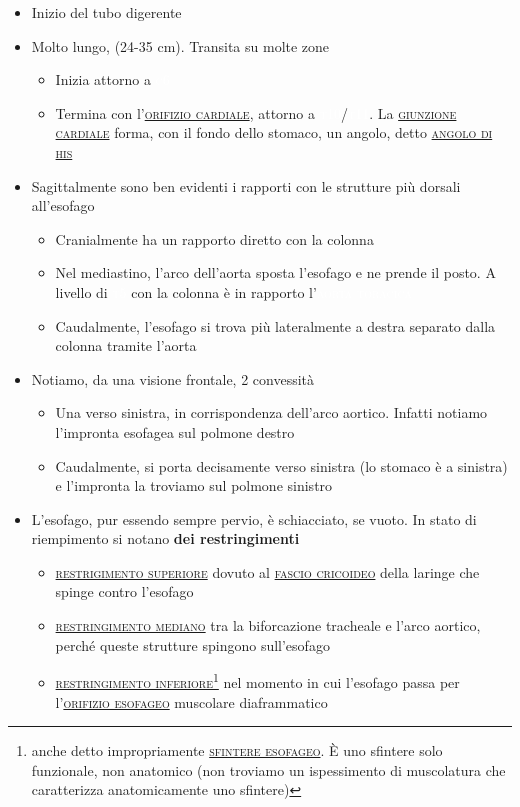 \documentclass[italian,]{article}
\providecommand{\tightlist}{%
  \setlength{\itemsep}{0pt}\setlength{\parskip}{0pt}}
\newcommand{\oss}[1]{\colorbox{ossa}{\textcolor{white}{\textsc{#1}}}}
\newcommand{\art}[1]{\colorbox{RedOrange}{\textcolor{white}{\textsc{#1}}}}
\renewcommand{\a}[1]{\underline{\textsc{#1}}}
\begin{document}
\begin{itemize}
\tightlist
\item
  Inizio del tubo digerente
\item
  Molto lungo, (24-35 cm). Transita su molte zone

  \begin{itemize}
  \tightlist
  \item
    Inizia attorno a \oss{c6}
  \item
    Termina con l'\a{orifizio cardiale}, attorno a \oss{t10}/\oss{t11}.
    La \a{giunzione cardiale} forma, con il fondo dello stomaco, un
    angolo, detto \a{angolo di his}
  \end{itemize}
\item
  Sagittalmente sono ben evidenti i rapporti con le strutture più
  dorsali all'esofago

  \begin{itemize}
  \tightlist
  \item
    Cranialmente ha un rapporto diretto con la colonna
  \item
    Nel mediastino, l'arco dell'aorta sposta l'esofago e ne prende il
    posto. A livello di \oss{t5} con la colonna è in rapporto
    l'\art{aorta toracica}
  \item
    Caudalmente, l'esofago si trova più lateralmente a destra separato
    dalla colonna tramite l'aorta
  \end{itemize}
\item
  Notiamo, da una visione frontale, 2 convessità

  \begin{itemize}
  \tightlist
  \item
    Una verso sinistra, in corrispondenza dell'arco aortico. Infatti
    notiamo l'impronta esofagea sul polmone destro
  \item
    Caudalmente, si porta decisamente verso sinistra (lo stomaco è a
    sinistra) e l'impronta la troviamo sul polmone sinistro
  \end{itemize}
\item
  L'esofago, pur essendo sempre pervio, è schiacciato, se vuoto. In
  stato di riempimento si notano \textbf{dei restringimenti}

  \begin{itemize}
  \tightlist
  \item
    \a{restrigimento superiore} dovuto al \a{fascio cricoideo} della
    laringe che spinge contro l'esofago
  \item
    \a{restringimento mediano} tra la biforcazione tracheale e l'arco
    aortico, perché queste strutture spingono sull'esofago
  \item
    \a{restringimento inferiore}\footnote{anche detto impropriamente
      \a{sfintere esofageo}. È uno sfintere solo funzionale, non
      anatomico (non troviamo un ispessimento di muscolatura che
      caratterizza anatomicamente uno sfintere)} nel momento in cui
    l'esofago passa per l'\a{orifizio esofageo} muscolare diaframmatico
  \end{itemize}
\end{itemize}
\end{document}
